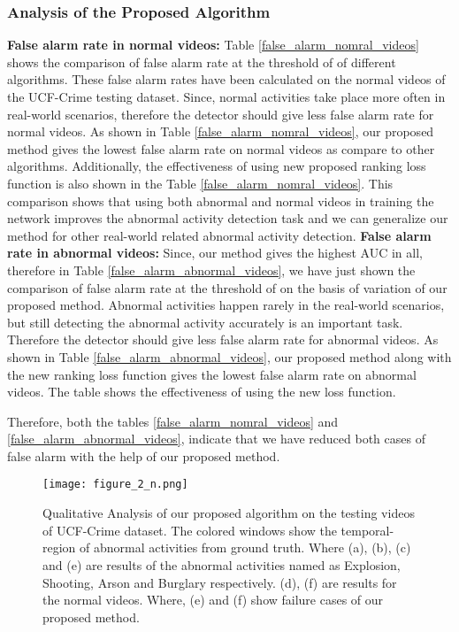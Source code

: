 \documentclass[conference]{IEEEtran}
\begin{document}
\subsubsection{Analysis of the Proposed Algorithm}
\textbf{False alarm rate in normal videos: } Table \ref{false_alarm_nomral_videos} shows the comparison of false alarm rate at the threshold of  of different algorithms. These false alarm rates have been calculated on the normal videos of the UCF-Crime \cite{A5} testing dataset. Since, normal activities take place more often in real-world scenarios, therefore the detector should give less false alarm rate for normal videos. As shown in Table \ref{false_alarm_nomral_videos}, our proposed method gives the lowest false alarm rate on normal videos as compare to other algorithms. Additionally, the effectiveness of using new proposed ranking loss function is also shown in the Table \ref{false_alarm_nomral_videos}. This comparison shows that using both abnormal and normal videos in training the network improves the abnormal activity detection task and we can generalize our method for other real-world related abnormal activity detection.
\textbf{False alarm rate in abnormal videos: } Since, our method gives the highest AUC in all, therefore in Table \ref{false_alarm_abnormal_videos}, we have just shown the comparison of false alarm rate at the threshold of  on the basis of variation of our proposed method. Abnormal activities happen rarely in the real-world scenarios, but still detecting the abnormal activity accurately is an important task. Therefore the detector should give less false alarm rate for abnormal videos. As shown in Table \ref{false_alarm_abnormal_videos}, our proposed method along with the new ranking loss function gives the lowest false alarm rate on abnormal videos. The table shows the effectiveness of using the new loss function. 

Therefore, both the tables \ref{false_alarm_nomral_videos} and \ref{false_alarm_abnormal_videos}, indicate that we have reduced both cases of false alarm with the help of our proposed method.


\begin{figure*}

	\begin{center}
		\texttt{[image: figure\_2\_n.png]}
		
	\end{center}
	\caption{Qualitative Analysis of our proposed algorithm on the testing videos of UCF-Crime dataset. The colored windows show the temporal-region of abnormal activities from ground truth. Where (a), (b), (c) and (e) are results of the abnormal activities named as Explosion, Shooting, Arson and Burglary respectively. (d), (f) are results for the normal videos. Where, (e) and (f) show failure cases of our proposed method.}
	\label{Qualitative_graphs}
\end{figure*}
\end{document}
